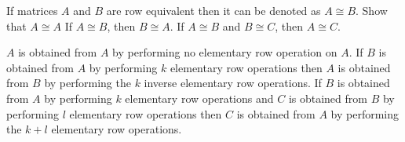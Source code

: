 
\begin{Exercise}[name={},
title={}, 
origin={\cite{OV}},
counter=Exercise]
If matrices $A$ and $B$ are row equivalent then it can be denoted as $A\cong B$. Show that
\Question $A\cong A$
\Question If $A\cong B$, then $B\cong A$.
\Question If $A\cong B$ and $B\cong C$, then $A\cong C$.
\end{Exercise}

\begin{Answer}
\Question $A$ is obtained from $A$ by performing no elementary row operation on $A$.
\Question If $B$ is obtained from $A$ by performing $k$ elementary row operations then $A$ is 
obtained from $B$ by performing the $k$ inverse elementary row operations.
\Question If $B$ is obtained from $A$ by performing $k$ elementary row operations and $C$ is obtained from $B$ by performing $l$ elementary row operations then $C$ is obtained from $A$ by performing the $k+l$ elementary row operations.
\end{Answer}

